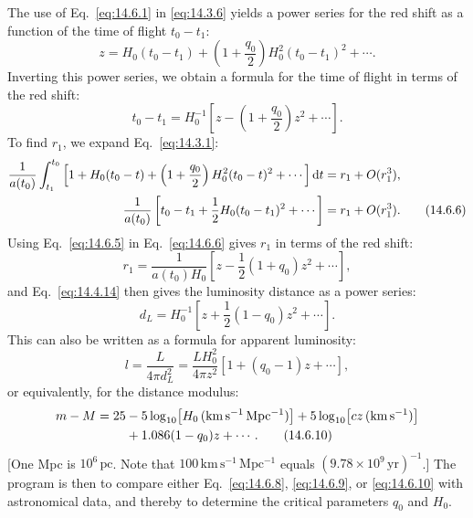 The use of Eq.~\eqref{eq:14.6.1} in \eqref{eq:14.3.6} yields a power series
for the red shift as a function of the time of flight \(t_0-t_1\):
\begin{equation}
  z
  =
  H_0(t_0-t_1)
  +
  \left(1+\frac{q_0}{2}\right)
  H_0^2(t_0-t_1)^2
  +\cdots.
  \tag{14.6.4}\label{eq:14.6.4}
\end{equation}
Inverting this power series, we obtain a formula for the time of flight in
terms of the red shift:
\begin{equation}
  t_0-t_1
  =
  H_0^{-1}
  \left[
    z-\left(1+\frac{q_0}{2}\right)z^2+\cdots
  \right].
  \tag{14.6.5}\label{eq:14.6.5}
\end{equation}
To find \(r_1\), we expand Eq.~\eqref{eq:14.3.1}:
\begin{align}
  \frac{1}{a(t_0)}
  \int_{t_1}^{t_0}
  \left[
    1+H_0(t_0-t)
    +\left(1+\frac{q_0}{2}\right)H_0^2(t_0-t)^2
    +\cdots
  \right]\mathop{}\!\mathrm{d} t
  &=
  r_1+O(r_1^3),
  \notag\\
  \frac{1}{a(t_0)}
  \left[
    t_0-t_1+\frac12H_0(t_0-t_1)^2+\cdots
  \right]
  &=
  r_1+O(r_1^3).
  \tag{14.6.6}\label{eq:14.6.6}
\end{align}
Using Eq.~\eqref{eq:14.6.5} in Eq.~\eqref{eq:14.6.6} gives \(r_1\) in
terms of the red shift:
\begin{equation}
  r_1
  =
  \frac{1}{a(t_0)H_0}
  \left[
    z-\frac12(1+q_0)z^2+\cdots
  \right],
  \tag{14.6.7}\label{eq:14.6.7}
\end{equation}
and Eq.~\eqref{eq:14.4.14} then gives the luminosity distance as a power
series:
\begin{equation}
  d_L
  =
  H_0^{-1}
  \left[
    z+\frac12(1-q_0)z^2+\cdots
  \right].
  \tag{14.6.8}\label{eq:14.6.8}
\end{equation}
This can also be written as a formula for apparent luminosity:
\begin{equation}
  l
  =
  \frac{L}{4\pi d_L^2}
  =
  \frac{LH_0^2}{4\pi z^2}
  \left[
    1+(q_0-1)z+\cdots
  \right],
  \tag{14.6.9}\label{eq:14.6.9}
\end{equation}
or equivalently, for the distance modulus:
\begin{align}
  m-M
  ={}&
  25
  -5\log_{10}\!\left[
    H_0\,(\mathrm{km\,s^{-1}\,Mpc^{-1}})
  \right]
  +5\log_{10}\!\left[
    cz\,(\mathrm{km\,s^{-1}})
  \right]
  \notag\\
  &\quad
  +1.086(1-q_0)z+\cdots.
  \tag{14.6.10}\label{eq:14.6.10}
\end{align}
[One Mpc is \(10^6\,\mathrm{pc}\). Note that
\(100\,\mathrm{km\,s^{-1}\,Mpc^{-1}}\) equals
\((9.78\times10^9\,\mathrm{yr})^{-1}\).] The program is then to compare
either Eq.~\eqref{eq:14.6.8}, \eqref{eq:14.6.9}, or \eqref{eq:14.6.10}
with astronomical data, and thereby to determine the critical parameters
\(q_0\) and \(H_0\).

